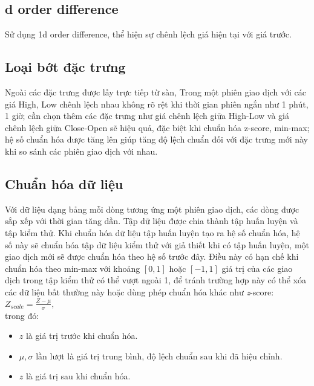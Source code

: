 \subsection{d order difference }
Sử dụng 1d order difference, thể hiện sự chênh lệch giá hiện tại với giá trước.

\subsection{Loại bớt đặc trưng}
Ngoài các đặc trưng được lấy trực tiếp từ sàn, Trong một phiên giao dịch với các giá High, Low chênh lệch nhau không rõ rệt khi thời gian phiên ngắn như 1 phút, 1 giờ; cần chọn thêm các đặc trưng như giá chênh lệch giữa High-Low và giá chênh lệch giữa Close-Open sẽ hiệu quả, đặc biệt khi chuẩn hóa z-score, min-max; hệ số chuẩn hóa được tăng lên giúp tăng độ lệch chuẩn đối với đặc trưng mới này khi so sánh các phiên giao dịch với nhau.\\

\subsection{Chuẩn hóa dữ liệu}

Với dữ liệu dạng bảng mỗi dòng tương ứng một phiên giao dịch, các dòng được sắp xếp với thời gian tăng dần. Tập dữ liệu được chia thành tập huấn luyện và tập kiểm thử.  Khi chuẩn hóa dữ liệu tập huấn luyện tạo ra hệ số chuẩn hóa, hệ số này sẽ chuẩn hóa tập dữ liệu kiểm thử với giả thiết khi có tập huấn luyện, một giao dịch mới sẽ được chuẩn hóa theo hệ số trước đây. Điều này có hạn chế  khi chuẩn hóa theo min-max với khoảng $[0, 1]$ hoặc $[-1, 1]$ giá trị của các giao dịch trong tập kiểm thử có thể vượt ngoài 1, để tránh trường hợp này có thể  xóa các dữ liệu bất thường này hoặc dùng phép chuẩn hóa khác như \textit{z}-score:\\
$ Z_{scale} = \frac{Z - \mu}{\sigma},$\\
trong đó:
\begin{itemize}
    \item $z$ là giá trị trước khi chuẩn hóa.
    
    \item $\mu, \sigma$ lần lượt là giá trị trung bình, độ lệch chuẩn sau khi đã hiệu chỉnh.
    
    \item $\textit{z}$ là giá trị sau khi chuẩn hóa.
    
\end{itemize}

